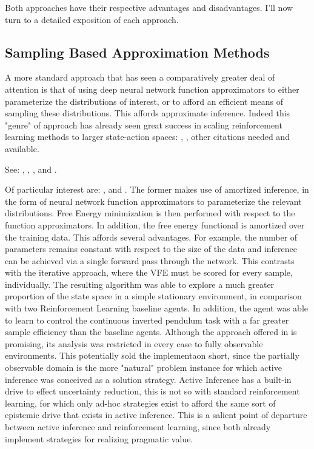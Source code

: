 \documentclass[onecolumn]{IEEEtran}
\begin{document}
Both approaches have their respective advantages and disadvantages. I'll now turn to a detailed exposition of each approach. 

\subsection{Sampling Based Approximation Methods}

A more standard approach that has seen a comparatively greater deal of attention is that of using deep neural network function approximators to either parameterize the distributions of interest, or to afford an efficient means of sampling these distributions. This affords approximate inference. Indeed this "genre" of approach has already seen great success in scaling reinforcement learning methods to larger state-action spaces: \textcite{Async-Methods-Deep-RL}, \textcite{ATARI-Deep-RL}, other citations needed and available.

See: \textcite{Deep-AIF}, \textcite{Applications-of-FEP-Machine-Learning-Neuroscience}, \textcite{Deep-AIF-As-Var-Policy-Grad}, \textcite{Reinforcement-Learning-Through-AIF} and \textcite{Bayesian-Policy-Selection-Using-AIF}. 

Of particular interest are: \textcite{Scaling-AIF}, \textcite{Bayesian-Policy-Selection-Using-AIF} and \textcite{Contrastive-AIF}. The former makes use of amortized inference, in the form of neural network function approximators to parameterize the relevant distributions. Free Energy minimization is then performed with respect to the function approximators. In addition, the free energy functional is amortized over the training data. This affords several advantages. For example, the number of parameters remains constant with respect to the size of the data and inference can be achieved via a single forward pass through the network. This contrasts with the iterative approach, where the VFE must be scored for every sample, individually. The resulting algorithm was able to explore a much greater proportion of the state space in a simple stationary environment, in comparison with two Reinforcement Learning baseline agents. In addition, the agent was able to learn to control the continuous inverted pendulum task with a far greater sample efficiency than the baseline agents. Although the approach offered in \textcite{Scaling-AIF} is promising, its analysis was restricted in every case to fully observable environments. This potentially sold the implementaon short, since the partially observable domain is the more "natural" problem instance for which active inference was conceived as a solution strategy. Active Inference has a built-in drive to effect uncertainty reduction, this is not so with standard reinforcement learning, for which only ad-hoc strategies exist to afford the same sort of epistemic drive that exists in active inference. This is a salient point of departure between active inference and reinforcement learning, since both already implement strategies for realizing pragmatic value. 
\end{document}

